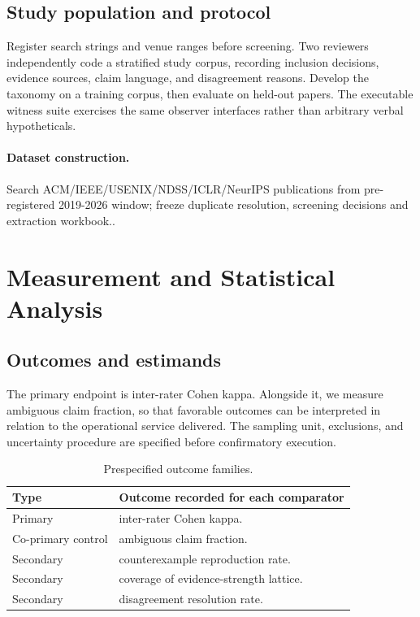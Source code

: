\documentclass[11pt,a4paper]{article}
\begin{document}
\subsection{Study population and protocol}
Register search strings and venue ranges before screening. Two reviewers independently code a stratified study corpus, recording inclusion decisions, evidence sources, claim language, and disagreement reasons. Develop the taxonomy on a training corpus, then evaluate on held-out papers. The executable witness suite exercises the same observer interfaces rather than arbitrary verbal hypotheticals.

\paragraph{Dataset construction.} Search ACM/IEEE/USENIX/NDSS/ICLR/NeurIPS publications from pre-registered 2019-2026 window; freeze duplicate resolution, screening decisions and extraction workbook..

\section{Measurement and Statistical Analysis}
\subsection{Outcomes and estimands}
The primary endpoint is inter-rater Cohen kappa. Alongside it, we measure ambiguous claim fraction, so that favorable outcomes can be interpreted in relation to the operational service delivered. The sampling unit, exclusions, and uncertainty procedure are specified before confirmatory execution.
\begin{table}[ht]
\centering\footnotesize
\caption{Prespecified outcome families.}
\begin{tabularx}{\linewidth}{@{}lX@{}}\toprule
Type & Outcome recorded for each comparator \\ \midrule
Primary & inter-rater Cohen kappa. \\ 
Co-primary control & ambiguous claim fraction. \\ 
Secondary & counterexample reproduction rate. \\ 
Secondary & coverage of evidence-strength lattice. \\ 
Secondary & disagreement resolution rate. \\ 
\bottomrule\end{tabularx}
\end{table}
\end{document}
